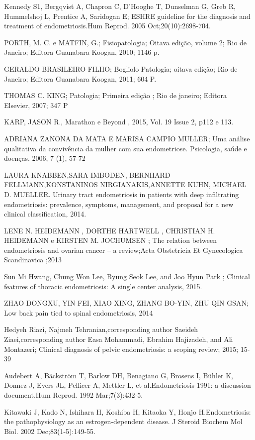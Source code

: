 \documentclass[12pt]{article} %
\begin{document}
Kennedy S1, Bergqvist A, Chapron C, D'Hooghe T, Dunselman G, Greb R, Hummelshoj L, Prentice A, Saridogan E; ESHRE guideline for the diagnosis and treatment of endometriosis.Hum Reprod. 2005 Oct;20(10):2698-704. 


PORTH, M. C. e MATFIN, G.; Fisiopatologia; Oitava edição, volume 2; Rio de
Janeiro; Editora Guanabara Koogan, 2010; 1146 p.

GERALDO BRASILEIRO FILHO; Bogliolo Patologia; oitava edição; Rio de Janeiro; Editora Guanabara Koogan, 2011; 604 P.

THOMAS C. KING; Patologia; Primeira edição ; Rio de janeiro; Editora Elsevier, 2007; 347 P

KARP, JASON R., Marathon e Beyond , 2015, Vol. 19 Issue 2, p112 e 113.

ADRIANA ZANONA DA MATA E MARISA CAMPIO MULLER; Uma análise qualitativa da convivência da mulher com sua endometriose. Psicologia, saúde e doenças. 2006, 7 (1), 57-72

LAURA KNABBEN,SARA IMBODEN, BERNHARD FELLMANN,KONSTANINOS NIRGIANAKIS,ANNETTE KUHN, MICHAEL D. MUELLER. Urinary tract endometriosis in patients with deep infiltrating endometriosis: prevalence, symptoms, management, and proposal for a new clinical classification, 2014.

LENE N. HEIDEMANN , DORTHE HARTWELL , CHRISTIAN H. HEIDEMANN e KIRSTEN M.
JOCHUMSEN ; The relation between endometriosis and ovarian cancer – a
review;Acta Obstetricia Et Gynecologica Scandinavica ;2013

Sun Mi Hwang, Chung Won Lee, Byung Seok Lee, and Joo Hyun Park ; Clinical features of thoracic endometriosis: A single center analysis, 2015.

ZHAO DONGXU, YIN FEI, XIAO XING, ZHANG BO-YIN, ZHU QIN GSAN; Low back pain tied to spinal endometriosis, 2014


Hedyeh Riazi, Najmeh Tehranian,corresponding author Saeideh Ziaei,corresponding author Easa Mohammadi, Ebrahim Hajizadeh, and Ali Montazeri; Clinical diagnosis of pelvic endometriosis: a scoping review; 2015; 15-39

Audebert A, Bäckström T, Barlow DH, Benagiano G, Brosens I, Bühler K, Donnez J, Evers JL, Pellicer A, Mettler L, et al.Endometriosis 1991: a discussion document.Hum Reprod. 1992 Mar;7(3):432-5.

Kitawaki J, Kado N, Ishihara H, Koshiba H, Kitaoka Y, Honjo H.Endometriosis: the pathophysiology as an estrogen-dependent disease. J Steroid Biochem Mol Biol. 2002 Dec;83(1-5):149-55.
\end{document}
